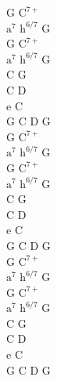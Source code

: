 \begin{chord}
    G $\mathrm{C^{7+}}$\\
    $\mathrm{a^7}$ $\mathrm{h^{6/7}}$ G\\
    G $\mathrm{C^{7+}}$\\
    $\mathrm{a^7}$ $\mathrm{h^{6/7}}$ G\\
    C G\\
    C D\\
    e C\\
    G C D G\\
    G $\mathrm{C^{7+}}$\\
    $\mathrm{a^7}$ $\mathrm{h^{6/7}}$ G\\
    G $\mathrm{C^{7+}}$\\
    $\mathrm{a^7}$ $\mathrm{h^{6/7}}$ G\\
    C G\\
    C D\\
    e C\\
    G C D G\\
    G $\mathrm{C^{7+}}$\\
    $\mathrm{a^7}$ $\mathrm{h^{6/7}}$ G\\
    G $\mathrm{C^{7+}}$\\
    $\mathrm{a^7}$ $\mathrm{h^{6/7}}$ G\\
    C G\\
    C D\\
    e C\\
    G C D G\\
\end{chord}
